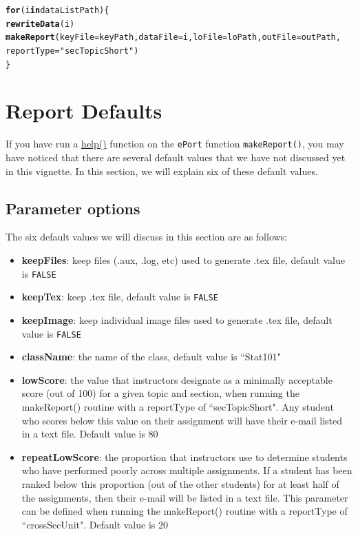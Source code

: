\documentclass{article}\usepackage[]{graphicx}\usepackage[]{color}
\makeatletter
\newcommand{\hlstr}[1]{\textcolor[rgb]{0.192,0.494,0.8}{#1}}%
\newcommand{\hlstd}[1]{\textcolor[rgb]{0.345,0.345,0.345}{#1}}%
\newcommand{\hlkwa}[1]{\textcolor[rgb]{0.161,0.373,0.58}{\textbf{#1}}}%
\newcommand{\hlkwc}[1]{\textcolor[rgb]{0.333,0.667,0.333}{#1}}%
\newcommand{\hlkwd}[1]{\textcolor[rgb]{0.737,0.353,0.396}{\textbf{#1}}}%
\newenvironment{kframe}{%
 \def\at@end@of@kframe{}%
 \ifinner\ifhmode%
  \def\at@end@of@kframe{\end{minipage}}%
  \begin{minipage}{\columnwidth}%
 \fi\fi%
 \def\FrameCommand##1{\hskip\@totalleftmargin \hskip-\fboxsep
 \colorbox{shadecolor}{##1}\hskip-\fboxsep
     \hskip-\linewidth \hskip-\@totalleftmargin \hskip\columnwidth}%
 \MakeFramed {\advance\hsize-\width
   \@totalleftmargin\z@ \linewidth\hsize
   \@setminipage}}%
 {\par\unskip\endMakeFramed%
 \at@end@of@kframe}
\newenvironment{knitrout}{}{} %
\numberwithin{equation}{section} %
\makeatother
\begin{document}
\begin{knitrout}
\color{fgcolor}\begin{kframe}
\begin{alltt}
\hlkwa{for} \hlstd{(i} \hlkwa{in} \hlstd{dataListPath)\{}
  \hlkwd{rewriteData}\hlstd{(i)}
  \hlkwd{makeReport}\hlstd{(}\hlkwc{keyFile} \hlstd{= keyPath,} \hlkwc{dataFile} \hlstd{= i,} \hlkwc{loFile} \hlstd{= loPath,} \hlkwc{outFile} \hlstd{= outPath,}
    \hlkwc{reportType} \hlstd{=} \hlstr{"secTopicShort"}\hlstd{)}
\hlstd{\}}
\end{alltt}
\end{kframe}
\end{knitrout}

\section{Report Defaults}
\label{sec:repOptions}

If you have run a \hyperref[sec:helpSection]{help()} function on the \texttt{ePort} function \texttt{makeReport()}, you may have noticed that there are several default values that we have not discussed yet in this vignette. In this section, we will explain six of these default values.

\subsection{Parameter options}

The six default values we will discuss in this section are as follows:

\begin{itemize}
\item \textbf{keepFiles}: keep files (.aux, .log, etc) used to generate .tex file, default value is \texttt{FALSE}
\item \textbf{keepTex}: keep .tex file, default value is \texttt{FALSE}
\item \textbf{keepImage}: keep individual image files used to generate .tex file, default value is \texttt{FALSE}
\item \textbf{className}: the name of the class, default value is ``Stat101"
\item \textbf{lowScore}: the value that instructors designate as a minimally acceptable score (out of 100) for a given topic and section, when running the makeReport() routine with a reportType of ``secTopicShort". Any student who scores below this value on their assignment will have their e-mail listed in a text file. Default value is 80
\item \textbf{repeatLowScore}: the proportion that instructors use to determine students who have performed poorly across multiple assignments. If a student has been ranked below this proportion (out of the other students) for at least half of the assignments, then their e-mail will be listed in a text file. This parameter can be defined when running the makeReport() routine with a reportType of ``crossSecUnit". Default value is 20
\end{itemize}
\end{document}
